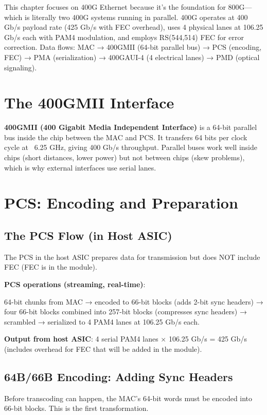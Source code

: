 \documentclass[openany]{tufte-book}
\begin{document}
This chapter focuses on 400G Ethernet because it's the foundation for 800G---which is literally two 400G systems running in parallel. 400G operates at 400 Gb/s payload rate (425 Gb/s with FEC overhead), uses 4 physical lanes at 106.25 Gb/s each with PAM4 modulation, and employs RS(544,514) FEC for error correction. Data flows: MAC → 400GMII (64-bit parallel bus) → PCS (encoding, FEC) → PMA (serialization) → 400GAUI-4 (4 electrical lanes) → PMD (optical signaling).

\section{The 400GMII Interface}

\textbf{400GMII (400 Gigabit Media Independent Interface)} is a 64-bit parallel bus inside the chip between the MAC and PCS. It transfers 64 bits per clock cycle at ~6.25 GHz, giving 400 Gb/s throughput. Parallel buses work well inside chips (short distances, lower power) but not between chips (skew problems), which is why external interfaces use serial lanes.

\section{PCS: Encoding and Preparation}

\subsection{The PCS Flow (in Host ASIC)}

The PCS in the host ASIC prepares data for transmission but does NOT include FEC (FEC is in the module).

\textbf{PCS operations (streaming, real-time)}:

64-bit chunks from MAC → encoded to 66-bit blocks (adds 2-bit sync headers) → four 66-bit blocks combined into 257-bit blocks (compresses sync headers) → scrambled → serialized to 4 PAM4 lanes at 106.25 Gb/s each.

\textbf{Output from host ASIC}: 4 serial PAM4 lanes × 106.25 Gb/s = 425 Gb/s (includes overhead for FEC that will be added in the module).

\subsection{64B/66B Encoding: Adding Sync Headers}

Before transcoding can happen, the MAC's 64-bit words must be encoded into
66-bit blocks. This is the first transformation.
\end{document}
